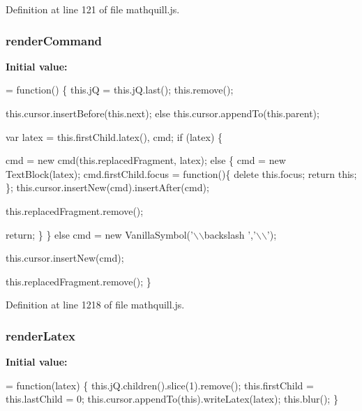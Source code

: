 Definition at line 121 of file mathquill.\-js.

\subsubsection[{render\-Command}]{\setlength{\rightskip}{0pt plus 5cm}{\bf \-\_\-} render\-Command}\label{mathquill_8js_aebdb1c86809ac361a809f8da6cb7c4bd}
{\bfseries Initial value\-:}
\begin{DoxyCode}
= \textcolor{keyword}{function}() \{
  this.jQ = this.jQ.last();
  this.\textcolor{keyword}{remove}();

    this.cursor.insertBefore(this.next);
  \textcolor{keywordflow}{else}
    this.cursor.appendTo(this.parent);

  var latex = this.firstChild.latex(), cmd;
  \textcolor{keywordflow}{if} (latex) \{

      cmd = \textcolor{keyword}{new} cmd(this.replacedFragment, latex);
    \textcolor{keywordflow}{else} \{
      cmd = \textcolor{keyword}{new} TextBlock(latex);
      cmd.firstChild.focus = \textcolor{keyword}{function}()\{ \textcolor{keyword}{delete} this.focus; \textcolor{keywordflow}{return} \textcolor{keyword}{this}; \};
      this.cursor.insertNew(cmd).insertAfter(cmd);

        this.replacedFragment.remove();

      \textcolor{keywordflow}{return};
    \}
  \}
  \textcolor{keywordflow}{else}
    cmd = \textcolor{keyword}{new} VanillaSymbol(\textcolor{stringliteral}{'\(\backslash\)\(\backslash\)backslash '},\textcolor{charliteral}{'\(\backslash\)\(\backslash\)'});

  this.cursor.insertNew(cmd);

    this.replacedFragment.remove();
\}
\end{DoxyCode}


Definition at line 1218 of file mathquill.\-js.

\subsubsection[{render\-Latex}]{\setlength{\rightskip}{0pt plus 5cm}{\bf \-\_\-} render\-Latex}\label{mathquill_8js_a357c5b52cfa63b4d1f594384207b251f}
{\bfseries Initial value\-:}
\begin{DoxyCode}
= \textcolor{keyword}{function}(latex) \{
  this.jQ.children().slice(1).remove();
  this.firstChild = this.lastChild = 0;
  this.cursor.appendTo(\textcolor{keyword}{this}).writeLatex(latex);
  this.blur();
\}
\end{DoxyCode}


